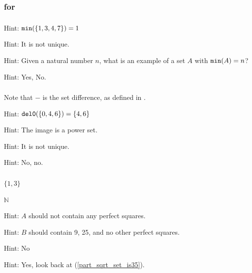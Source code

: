 \subsubsection{\answers for 
\subsetfn}

\subsubsection*{ \answers}
\begin{apart}
    \item Hint: $\texttt{min}(\{1,3,4,7\})=1$
    \item Hint: It is not unique.
    \item Hint:  Given a natural number $n$, what is an example of a set $A$ with $\texttt{min}(A) = n$?
    \item Hint: Yes, No.
\end{apart}

\subsubsection*{ \answers}
Note that $-$ is the set difference, as defined in .
\begin{apart}
    \item Hint: $\texttt{del0}(\{0,4,6\})=\{4,6\}$
    \item Hint: The image is a power set.
    \item Hint: It is not unique.
    \item Hint: No, no.
\end{apart}

\subsubsection*{ \answers}
\begin{apart}
    \item $\{1,3\}$
    \item $\mathbb{N}$
    \item Hint: $A$ should not contain any perfect squares.
    \item \label{part_sqrt_set_is35} Hint: $B$ should contain 9, 25, and no other perfect squares.
    \item Hint: No
    \item Hint: Yes, look back at (\ref{part_sqrt_set_is35}).
\end{apart}





